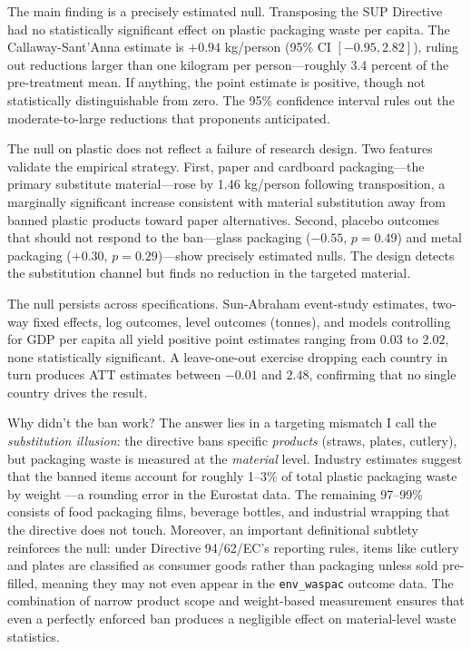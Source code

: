 \documentclass[12pt]{article}
\begin{document}
The main finding is a precisely estimated null. Transposing the SUP Directive had no statistically significant effect on plastic packaging waste per capita. The Callaway-Sant'Anna estimate is $+0.94$ kg/person (95\% CI $[-0.95, 2.82]$), ruling out reductions larger than one kilogram per person---roughly 3.4 percent of the pre-treatment mean. If anything, the point estimate is positive, though not statistically distinguishable from zero. The 95\% confidence interval rules out the moderate-to-large reductions that proponents anticipated.

The null on plastic does not reflect a failure of research design. Two features validate the empirical strategy. First, paper and cardboard packaging---the primary substitute material---rose by 1.46 kg/person following transposition, a marginally significant increase consistent with material substitution away from banned plastic products toward paper alternatives. Second, placebo outcomes that should not respond to the ban---glass packaging ($-0.55$, $p = 0.49$) and metal packaging ($+0.30$, $p = 0.29$)---show precisely estimated nulls. The design detects the substitution channel but finds no reduction in the targeted material.

The null persists across specifications. Sun-Abraham event-study estimates, two-way fixed effects, log outcomes, level outcomes (tonnes), and models controlling for GDP per capita all yield positive point estimates ranging from $0.03$ to $2.02$, none statistically significant. A leave-one-out exercise dropping each country in turn produces ATT estimates between $-0.01$ and $2.48$, confirming that no single country drives the result.

Why didn't the ban work? The answer lies in a targeting mismatch I call the \textit{substitution illusion}: the directive bans specific \textit{products} (straws, plates, cutlery), but packaging waste is measured at the \textit{material} level. Industry estimates suggest that the banned items account for roughly 1--3\% of total plastic packaging waste by weight \citep{EC2018impact, plastics_europe2022}---a rounding error in the Eurostat data. The remaining 97--99\% consists of food packaging films, beverage bottles, and industrial wrapping that the directive does not touch. Moreover, an important definitional subtlety reinforces the null: under Directive 94/62/EC's reporting rules, items like cutlery and plates are classified as consumer goods rather than packaging unless sold pre-filled, meaning they may not even appear in the \texttt{env\_waspac} outcome data. The combination of narrow product scope and weight-based measurement ensures that even a perfectly enforced ban produces a negligible effect on material-level waste statistics.
\end{document}
